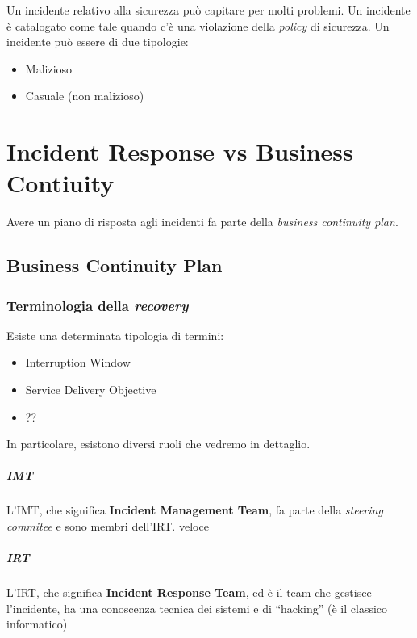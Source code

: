 Un incidente relativo alla sicurezza può capitare per molti problemi. Un
incidente è catalogato come tale quando c'è una violazione della \textit{policy}
di sicurezza. Un incidente può essere di due tipologie:
\begin{itemize}
\item Malizioso
\item Casuale (non malizioso)
\end{itemize}

\chapter{Incident Response vs Business Contiuity}
\label{IRBC}

Avere un piano di risposta agli incidenti fa parte della \textit{business
continuity plan}.

\section{Business Continuity Plan}

\subsection{Terminologia della \textit{recovery}}
Esiste una determinata tipologia di termini:
\begin{itemize}
\item Interruption Window
\item Service Delivery Objective
\item ?? 
\end{itemize}

In particolare, esistono diversi ruoli che vedremo in dettaglio.

\paragraph*{IMT} L'IMT, che significa \textbf{Incident Management Team}, fa
parte della \textit{steering commitee} e sono membri dell'IRT. %
veloce




\paragraph*{IRT} L'IRT, che significa \textbf{Incident Response Team}, ed è il
team che gestisce l'incidente, ha una conoscenza tecnica dei sistemi e di
``hacking'' (è il classico informatico)

